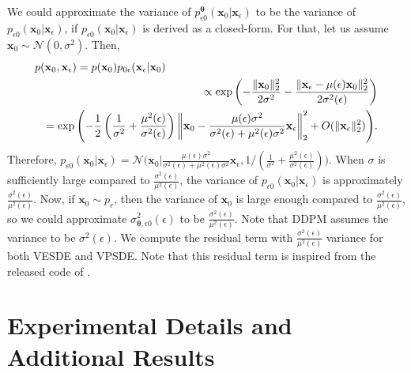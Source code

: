 \documentclass{article}
\theoremstyle{definition}
\theoremstyle{remark}
\begin{document}
	We could approximate the variance of $p_{\epsilon 0}^{\bm{\theta}}(\mathbf{x}_{0}\vert\mathbf{x}_{\epsilon})$ to be the variance of $p_{\epsilon 0}(\mathbf{x}_{0}\vert\mathbf{x}_{\epsilon})$, if $p_{\epsilon 0}(\mathbf{x}_{0}\vert\mathbf{x}_{\epsilon})$ is derived as a closed-form. For that, let us assume $\mathbf{x}_{0}\sim\mathcal{N}(0,\sigma^{2})$. Then,
	\begin{eqnarray*}
		\lefteqn{p(\mathbf{x}_{0},\mathbf{x}_{\epsilon})=p(\mathbf{x}_{0})p_{0\epsilon}(\mathbf{x}_{\epsilon}\vert\mathbf{x}_{0})}&\\
		&&\propto\exp{\left( -\frac{\Vert\mathbf{x}_{0}\Vert_{2}^{2}}{2\sigma^{2}} - \frac{\Vert\mathbf{x}_{\epsilon}-\mu(\epsilon)\mathbf{x}_{0}\Vert_{2}^{2}}{2\sigma^{2}(\epsilon)} \right)}\\
		&&=\exp{\left( -\frac{1}{2}\left( \frac{1}{\sigma^{2}}+\frac{\mu^{2}(\epsilon)}{\sigma^{2}(\epsilon)} \right) \left\Vert\mathbf{x}_{0}-\frac{\mu(\epsilon)\sigma^{2}}{\sigma^{2}(\epsilon)+\mu^{2}(\epsilon)\sigma^{2}}\mathbf{x}_{\epsilon}\right\Vert_{2}^{2}+O(\Vert\mathbf{x}_{\epsilon}\Vert_{2}^{2}) \right)}.
	\end{eqnarray*}
	Therefore, $p_{\epsilon 0}(\mathbf{x}_{0}\vert\mathbf{x}_{\epsilon})=\mathcal{N}\big(\mathbf{x}_{0}\big\vert\frac{\mu(\epsilon)\sigma^{2}}{\sigma^{2}(\epsilon)+\mu^{2}(\epsilon)\sigma^{2}}\mathbf{x}_{\epsilon},1/(\frac{1}{\sigma^{2}}+\frac{\mu^{2}(\epsilon)}{\sigma^{2}(\epsilon)})\big)$. When $\sigma$ is sufficiently large compared to $\frac{\sigma^{2}(\epsilon)}{\mu^{2}(\epsilon)}$, the variance of $p_{\epsilon 0}(\mathbf{x}_{0}\vert\mathbf{x}_{\epsilon})$ is approximately $\frac{\sigma^{2}(\epsilon)}{\mu^{2}(\epsilon)}$. Now, if $\mathbf{x}_{0}\sim p_{r}$, then the variance of $\mathbf{x}_{0}$ is large enough compared to $\frac{\sigma^{2}(\epsilon)}{\mu^{2}(\epsilon)}$, so we could approximate $\sigma_{\bm{\theta},\epsilon 0}^{2}(\epsilon)$ to be $\frac{\sigma^{2}(\epsilon)}{\mu^{2}(\epsilon)}$. Note that DDPM \cite{ho2020denoising} assumes the variance to be $\sigma^{2}(\epsilon)$. We compute the residual term with $\frac{\sigma^{2}(\epsilon)}{\mu^{2}(\epsilon)}$ variance for both VESDE and VPSDE. Note that this residual term is inspired from the released code of \citet{song2021maximum}.
	
	\section{Experimental Details and Additional Results}\label{appendix:experimental_details}
	
\end{document}
